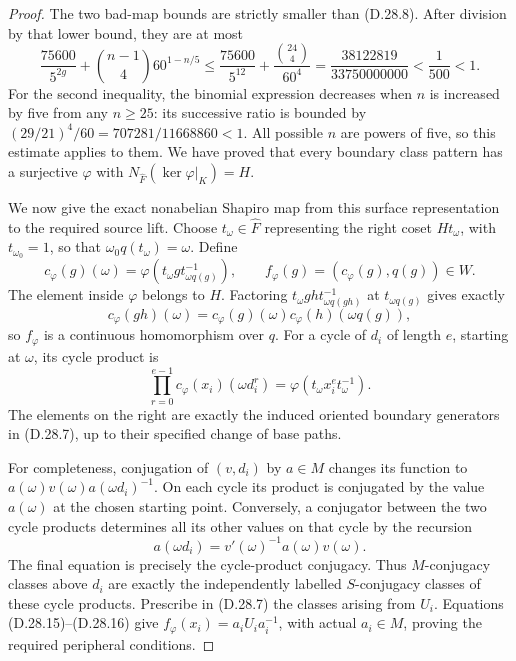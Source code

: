 \begin{proof}
The two bad-map bounds are strictly smaller than
\textup{(D.28.8)}.  After division by that lower bound,
they are at most
\[
 \frac{75600}{5^{2g}}+
        \binom{n-1}{4}60^{1-n/5}
 \leq\frac{75600}{5^{12}}+
        \frac{\binom{24}{4}}{60^4}
 =\frac{38122819}{33750000000}<\frac1{500}<1.
 \tag{D.28.12}
\]
For the second inequality, the binomial expression
decreases when $n$ is increased by five from any
$n\geq25$: its successive ratio is bounded by
$(29/21)^4/60=707281/11668860<1$.
All possible $n$ are powers of five, so this estimate
applies to them.  We have proved that every boundary
class pattern has a surjective $\varphi$ with
$N_{\widehat F}(\ker\varphi|_K)=H$.

We now give the exact nonabelian Shapiro map from this
surface representation to the required source lift.
Choose $t_\omega\in\widehat F$ representing the right
coset $H t_\omega$, with $t_{\omega_0}=1$, so that
$\omega_0 q(t_\omega)=\omega$.  Define
\[
 c_\varphi(g)(\omega)=
       \varphi(t_\omega g t_{\omega q(g)}^{-1}),
 \qquad
       f_\varphi(g)=(c_\varphi(g),q(g))\in W.
 \tag{D.28.13}
\]
The element inside $\varphi$ belongs to $H$.
Factoring $t_\omega gh t_{\omega q(gh)}^{-1}$ at
$t_{\omega q(g)}$ gives exactly
\[
 c_\varphi(gh)(\omega)=
 c_\varphi(g)(\omega)c_\varphi(h)(\omega q(g)),
 \tag{D.28.14}
\]
so $f_\varphi$ is a continuous homomorphism over $q$.
For a cycle of $d_i$ of length $e$, starting at
$\omega$, its cycle product is
\[
 \prod_{r=0}^{e-1}c_\varphi(x_i)(\omega d_i^r)
       =\varphi(t_\omega x_i^e t_\omega^{-1}).
 \tag{D.28.15}
\]
The elements on the right are exactly the induced
oriented boundary generators in \textup{(D.28.7)},
up to their specified change of base paths.

For completeness, conjugation of $(v,d_i)$ by
$a\in M$ changes its function to
$a(\omega)v(\omega)a(\omega d_i)^{-1}$.
On each cycle its product is conjugated by the value
$a(\omega)$ at the chosen starting point.  Conversely,
a conjugator between the two cycle products determines
all its other values on that cycle by the recursion
\[
 a(\omega d_i)=v'(\omega)^{-1}a(\omega)v(\omega).
 \tag{D.28.16}
\]
The final equation is precisely the cycle-product
conjugacy.  Thus $M$-conjugacy classes above $d_i$ are
exactly the independently labelled $S$-conjugacy classes
of these cycle products.  Prescribe in
\textup{(D.28.7)} the classes arising from $U_i$.
Equations \textup{(D.28.15)--(D.28.16)} give
$f_\varphi(x_i)=a_iU_ia_i^{-1}$, with actual
$a_i\in M$, proving the required peripheral conditions.


\end{proof}
